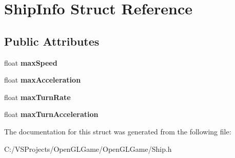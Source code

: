 \hypertarget{struct_ship_info}{\section{Ship\-Info Struct Reference}
\label{struct_ship_info}
}
\subsection*{Public Attributes}
\begin{DoxyCompactItemize}
\item 
\hypertarget{struct_ship_info_aac027024792c78cba53562c68b0e7fb0}{float {\bfseries max\-Speed}}\label{struct_ship_info_aac027024792c78cba53562c68b0e7fb0}

\item 
\hypertarget{struct_ship_info_aeae287250741db43f1e2a01146a5c370}{float {\bfseries max\-Acceleration}}\label{struct_ship_info_aeae287250741db43f1e2a01146a5c370}

\item 
\hypertarget{struct_ship_info_a8bbfba2cd07bc281ccc1ac54f71b1d53}{float {\bfseries max\-Turn\-Rate}}\label{struct_ship_info_a8bbfba2cd07bc281ccc1ac54f71b1d53}

\item 
\hypertarget{struct_ship_info_afe78074520ef427d990094f780597b85}{float {\bfseries max\-Turn\-Acceleration}}\label{struct_ship_info_afe78074520ef427d990094f780597b85}

\end{DoxyCompactItemize}


The documentation for this struct was generated from the following file\-:\begin{DoxyCompactItemize}
\item 
C\-:/\-V\-S\-Projects/\-Open\-G\-L\-Game/\-Open\-G\-L\-Game/Ship.\-h\end{DoxyCompactItemize}
